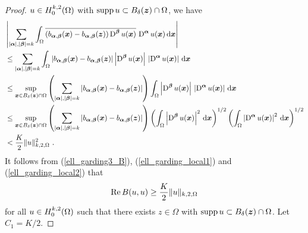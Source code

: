 \begin{proof}
$\displaystyle u \in H^{k,2}_0(\Omega)$ with
$\operatorname{supp} u \subset B_\delta({\bm{z}}) \cap \Omega$, we have
\begin{align}
&\left| \sum_{|{\bm{\alpha}}|,|{\bm{\beta}}|= k} \int_{\Omega}
\overline{\left(b_{{\bm{\alpha}},{\bm{\beta}}}({\bm{x}})
-b_{{\bm{\alpha}},{\bm{\beta}}}({\bm{z}})\right)
\operatorname{D}^{{\bm{\beta}}} u({\bm{x}})}\, \operatorname{D}^{{\bm{\alpha}}} u({\bm{x}})
\,\mathrm{d}{{\bm{x}}} \right|
\nonumber \\
& \leq \sum_{|{\bm{\alpha}}|,|{\bm{\beta}}|= k} \int_{\Omega}
\left|b_{{\bm{\alpha}},{\bm{\beta}}}({\bm{x}})
-b_{{\bm{\alpha}},{\bm{\beta}}}({\bm{z}})\right|
\left| \operatorname{D}^{{\bm{\beta}}} u({\bm{x}})\right|\,
\left| \operatorname{D}^{{\bm{\alpha}}} u({\bm{x}}) \right|\,\mathrm{d}{{\bm{x}}} \nonumber \\
& \leq \sup_{{\bm{x}}\in B_\delta({\bm{z}}) \cap \Omega}
\left( \sum_{|{\bm{\alpha}}|,|{\bm{\beta}}|= k}
\left|b_{{\bm{\alpha}},{\bm{\beta}}}({\bm{x}})
-b_{{\bm{\alpha}},{\bm{\beta}}}({\bm{z}})\right| \right)
\int_{\Omega} \left| \operatorname{D}^{{\bm{\beta}}} u({\bm{x}})\right|\,
\left| \operatorname{D}^{{\bm{\alpha}}} u({\bm{x}}) \right|\,\mathrm{d}{{\bm{x}}} \nonumber \\
& \leq \sup_{{\bm{x}}\in B_\delta({\bm{z}}) \cap \Omega}
\left( \sum_{|{\bm{\alpha}}|,|{\bm{\beta}}|= k}
\left|b_{{\bm{\alpha}},{\bm{\beta}}}({\bm{x}})
-b_{{\bm{\alpha}},{\bm{\beta}}}({\bm{z}})\right| \right)
\left( \int_{\Omega} \left| \operatorname{D}^{{\bm{\beta}}} u({\bm{x}})\right|^2 \,\mathrm{d}{{\bm{x}}}
\right)^{1/2}
\left( \int_{\Omega} \left| \operatorname{D}^{{\bm{\alpha}}} u({\bm{x}}) \right|^2 \,\mathrm{d}{{\bm{x}}}
\right)^{1/2} \nonumber \\
& < \frac{K}{2} \|u\|_{k,2,\Omega}^2 \ . \label{ell_garding_local2}
\end{align}
It follows from (\ref{ell_garding3_B}), (\ref{ell_garding_local1}) and
(\ref{ell_garding_local2}) that
\begin{equation} \label{ell_garding3_delta}
\operatorname{Re} B(u,u) \geq \frac{K}{2} \|u\|_{k,2,\Omega}
\end{equation}
for all $\displaystyle u \in H^{k,2}_0(\Omega)$ such that there
exists $z\in \Omega$ with $\operatorname{supp} u \subset B_{\delta}({\bm{z}}) \cap \Omega$.
Let $C_1=K/2$.


\end{proof}

